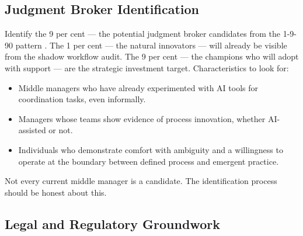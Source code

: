 \subsection{Judgment Broker Identification}

Identify the 9 per cent --- the potential judgment broker candidates from the 1-9-90 pattern \parencite{BCGAgenticShift2025}. The 1 per cent --- the natural innovators --- will already be visible from the shadow workflow audit. The 9 per cent --- the champions who will adopt with support --- are the strategic investment target. Characteristics to look for:

\begin{itemize}
  \item Middle managers who have already experimented with AI tools for coordination tasks, even informally.
  \item Managers whose teams show evidence of process innovation, whether AI-assisted or not.
  \item Individuals who demonstrate comfort with ambiguity and a willingness to operate at the boundary between defined process and emergent practice.
\end{itemize}

Not every current middle manager is a candidate. The identification process should be honest about this.

\subsection{Legal and Regulatory Groundwork}
\label{sec:legal-groundwork}

